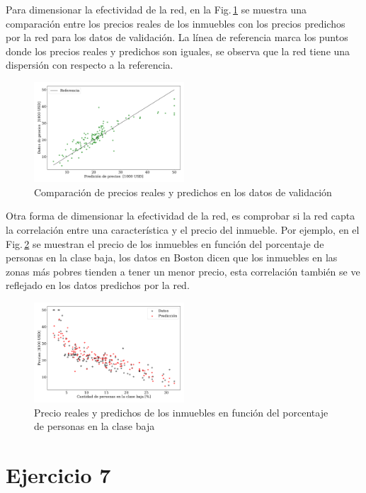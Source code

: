 Para dimensionar la efectividad de la red, en la Fig.\,\ref{fig:ejer1_comparacion} se muestra una comparación entre los precios reales de los inmuebles con los precios predichos por la red para los datos de validación. La línea de referencia marca los puntos donde los precios reales y predichos son iguales, se observa que la red tiene una dispersión con respecto a la referencia.

\begin{figure}[H]
    \begin{small}
        \begin{center}
            \includegraphics[width=0.5\textwidth]{Graphs/ejer1_versus.pdf}
        \end{center}
        \caption{Comparación de precios reales y predichos en los datos de validación}
        \label{fig:ejer1_comparacion}
    \end{small}
\end{figure}

Otra forma de dimensionar la efectividad de la red, es comprobar si la red capta la correlación entre una característica y el precio del inmueble. Por ejemplo, en el Fig.\,\ref{fig:ejer1_low_income} se muestran el precio de los inmuebles en función del porcentaje de personas en la clase baja, los datos en Boston dicen que los inmuebles en las zonas más  pobres tienden a tener un menor precio, esta correlación también se ve reflejado en los datos predichos por la red.

\begin{figure}[H]
    \begin{small}
        \begin{center}
            \includegraphics[width=0.5\textwidth]{Graphs/ejer1_low_income.pdf}
        \end{center}
        \caption{Precio reales y predichos de los inmuebles en función del porcentaje de personas en la clase baja}
        \label{fig:ejer1_low_income}
    \end{small}
\end{figure}


\section*{Ejercicio 7}




